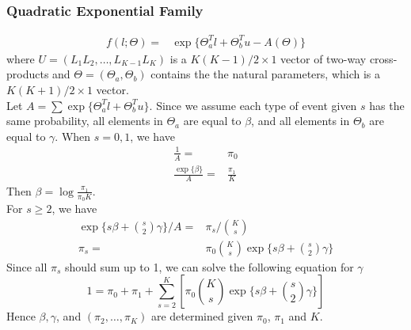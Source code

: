 \documentclass[11 pt, a4paper]{article}  %
\begin{document}
\newpage
\subsubsection{Quadratic Exponential Family}
\begin{align*}
f(l; \Theta) = & \exp \{\Theta_a^T l + \Theta_b^{T} u - A(\Theta)\}
\end{align*}
where $U = (L_{1}L_{2}, \ldots, L_{K-1}L_{K})$ is a $K(K-1)/2 \times 1$ vector of two-way cross-products and $\Theta = (\Theta_a, \Theta_b)$ contains the the natural parameters, which is a $K(K+1)/2 \times 1$ vector.\\

Let $A =\sum\exp\{\Theta_a^T l + \Theta_b^{T} u\}$. Since we assume each type of event given $s$ has the same probability, all elements in $\Theta_a$ are equal to $\beta$, and all elements in $\Theta_b$ are equal to $\gamma$. When $s = 0, 1$, we have 
\begin{align*}
\frac{1}{A} = & \pi_0\\
\frac{\exp\{\beta\}}{A} = & \frac{\pi_1}{K}
\end{align*}
Then $\beta = \log \frac{\pi_1}{\pi_0 K}$.\\

For $s\geq 2$, we have
\begin{align*}
\exp\{s\beta + {s \choose 2}\gamma\}/A = & \pi_s/{K \choose s}\\
\pi_s = & \pi_0 {K \choose s} \exp\{s\beta + {s \choose 2}\gamma\}
\end{align*}
Since all $\pi_s$ should sum up to 1, we can solve the following equation for $\gamma$
\[1 = \pi_0 +\pi_1 + \sum_{s=2}^K \left[ \pi_0 {K \choose s} \exp\{s\beta + {s \choose 2}\gamma\}\right]\]
Hence $\beta,\gamma$, and $(\pi_2,\ldots,\pi_K)$ are determined given $\pi_0$, $\pi_1$ and $K$. 

%
\end{document}
